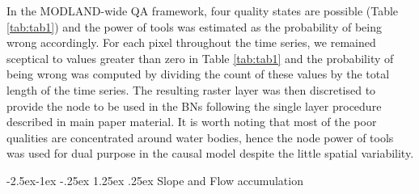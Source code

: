 \documentclass[12pt,oneside]{article}
\makeatletter
\renewcommand\paragraph{\@startsection{paragraph}{4}{\z@}%
            {-2.5ex\@plus -1ex \@minus -.25ex}%
            {1.25ex \@plus .25ex}%
            {\normalfont\normalsize\bfseries}}
\makeatother
\begin{document}
\begin{table}[t]

\caption{\label{tab:tab1}Translation of 2-bit pixel level-QA in MODLAND.\textsuperscript{\protect\hyperlink{ref-Roy_et_al_2002}{15}}}
\centering
{}
\end{table}

In the MODLAND-wide QA framework, four quality states are possible (Table \ref{tab:tab1}) and the power of tools was estimated as the probability of being wrong accordingly. For each pixel throughout the time series, we remained sceptical to values greater than zero in Table \ref{tab:tab1} and the probability of being wrong was computed by dividing the count of these values by the total length of the time series. The resulting raster layer was then discretised to provide the node to be used in the BNs following the single layer procedure described in main paper material. It is worth noting that most of the poor qualities are concentrated around water bodies, hence the node power of tools was used for dual purpose in the causal model despite the little spatial variability.

\hypertarget{I526}{%
\paragraph{Slope and Flow accumulation}\label{I526}}
\end{document}
